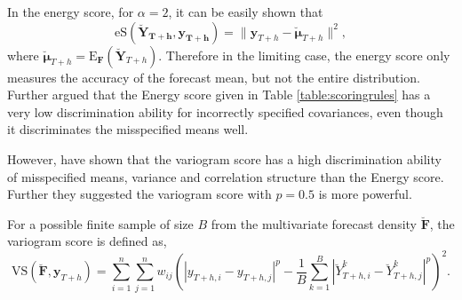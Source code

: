 \documentclass[a4paper, 11pt]{article}
\def\E{\text{E}}
\begin{document}
	In the energy score, for $\alpha=2$, it can be easily shown that
	\begin{equation} \label{eq:(5.1)}
	\text{eS}(\bm{\breve{Y}_{T+h},y_{T+h}}) = \|\bm{y}_{T+h}-\breve{\bm{\mu}}_{T+h}\|^2,
	\end{equation}
	where $\breve{\bm{\mu}}_{T+h} =\E_{\bm{F}}(\breve{\bm{Y}}_{T+h}) $. Therefore in the limiting case, the energy score only measures the accuracy of the forecast mean, but not the entire distribution. Further \citet{Pinson2013a} argued that the Energy score given in Table \ref{table:scoringrules} has a very low discrimination ability for incorrectly specified covariances, even though it discriminates the misspecified means well.
	
	However, \citet{SCHEUERER2015} have shown that the variogram score has a high discrimination ability of misspecified means, variance and correlation structure than the Energy score. Further they suggested the variogram score with $p=0.5$ is more powerful.
	
	For a possible finite sample of size $B$ from the multivariate forecast density $\breve{\bm{F}}$, the variogram score is defined as,
	\begin{equation}
	\text{VS}(\breve{\bm{F}}, \bm{y}_{T+h}) = \displaystyle\sum_{i=1}^{n}\displaystyle\sum_{j=1}^{n}w_{ij}\left(|y_{T+h,i} - y_{T+h,j}|^p - \frac{1}{B} \displaystyle\sum_{k=1}^{B} |\breve{Y}^k_{T+h,i}-\breve{Y}^k_{T+h,j}|^p\right)^2.
	\end{equation}
	
	
	
	
	
\end{document}
